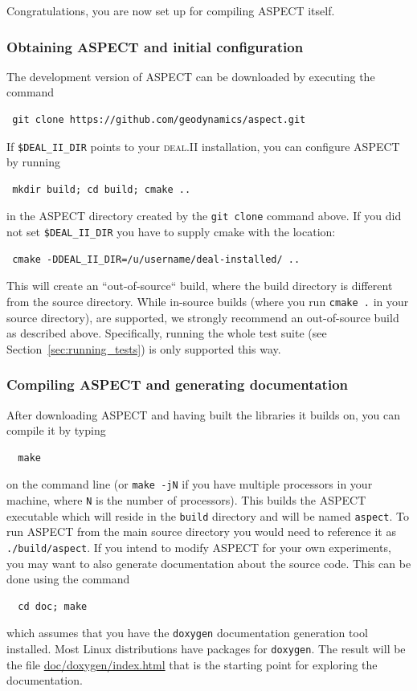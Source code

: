 \documentclass{article}
\newcommand{\dealii}{{\textsc{deal.II}}}
\newcommand{\aspect}{\textsc{ASPECT}}
\begin{document}
Congratulations, you are now set up for compiling \aspect{} itself.

\subsubsection{Obtaining \aspect{} and initial configuration}

The development version of \aspect{} can be downloaded by executing the command
\begin{verbatim}
 git clone https://github.com/geodynamics/aspect.git
\end{verbatim}
If {\texttt{\$DEAL\_II\_DIR}} points to your \dealii{} installation, you can configure
\aspect{} by running
\begin{verbatim}
 mkdir build; cd build; cmake ..
\end{verbatim}
in the \aspect{} directory created by the {\texttt{git clone}} command above.
If you did not set {\texttt{\$DEAL\_II\_DIR}} you have to supply cmake with the location:
\begin{verbatim}
 cmake -DDEAL_II_DIR=/u/username/deal-installed/ ..
\end{verbatim}

This will create an ``out-of-source`` build, where the build directory is
different from the source directory. While in-source builds (where you run
\texttt{cmake .} in your source directory), are supported, we strongly
recommend an out-of-source build as described above. Specifically, running
the whole test suite (see Section~\ref{sec:running_tests}) is only supported
this way.

\subsubsection{Compiling \aspect{} and generating documentation}
\label{sec:compiling}

After downloading \aspect{} and having built the libraries it builds on, you
can compile it by typing
\begin{verbatim}
  make
\end{verbatim}
on the command line (or \texttt{make -jN} if you have multiple processors in
your machine, where \texttt{N} is the number of processors). This builds the
\aspect{} executable which will reside in the \texttt{build} directory
and will be named \texttt{aspect}. To run \aspect{} from the main source directory
you would need to reference it as \texttt{./build/aspect}.
If you intend to
modify \aspect{} for your own experiments, you may want to also generate
documentation about the source code. This can be done using the command
\begin{verbatim}
  cd doc; make
\end{verbatim}
which assumes that you have the \texttt{doxygen} documentation generation tool
installed. Most Linux distributions have packages for \texttt{doxygen}. The
result will be the file \url{doc/doxygen/index.html} that is the starting
point for exploring the documentation.
\end{document}
